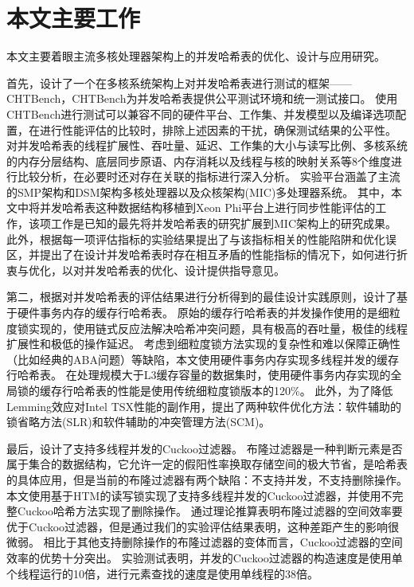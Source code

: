 \section{本文主要工作}
本文主要着眼主流多核处理器架构上的并发哈希表的优化、设计与应用研究。

首先，设计了一个在多核系统架构上对并发哈希表进行测试的框架——CHTBench，CHTBench为并发哈希表提供公平测试环境和统一测试接口。
使用CHTBench进行测试可以兼容不同的硬件平台、工作集、并发模型以及编译选项配置，在进行性能评估的比较时，排除上述因素的干扰，确保测试结果的公平性。
对并发哈希表的线程扩展性、吞吐量、延迟、工作集的大小与读写比例、多核系统的内存分层结构、底层同步原语、内存消耗以及线程与核的映射关系等8个维度进行比较分析，在必要时还对存在关联的指标进行深入分析。
实验平台涵盖了主流的SMP架构和DSM架构多核处理器以及众核架构(MIC)多处理器系统。
其中，本文中将并发哈希表这种数据结构移植到Xeon Phi平台上进行同步性能评估的工作，该项工作是已知的最先将并发哈希表的研究扩展到MIC架构上的研究成果。
此外，根据每一项评估指标的实验结果提出了与该指标相关的性能陷阱和优化误区，并提出了在设计并发哈希表时存在相互矛盾的性能指标的情况下，如何进行折衷与优化，以对并发哈希表的优化、设计提供指导意见。

第二，根据对并发哈希表的评估结果进行分析得到的最佳设计实践原则，设计了基于硬件事务内存的缓存行哈希表。
原始的缓存行哈希表的并发操作使用的是细粒度锁实现的，使用链式反应法解决哈希冲突问题，具有极高的吞吐量，极佳的线程扩展性和极低的操作延迟。
考虑到细粒度锁方法实现的复杂性和难以保障正确性（比如经典的ABA问题）等缺陷，本文使用硬件事务内存实现多线程并发的缓存行哈希表。
在处理规模大于L3缓存容量的数据集时，使用硬件事务内存实现的全局锁的缓存行哈希表的性能是使用传统细粒度锁版本的120\%。
此外，为了降低Lemming效应对Intel TSX性能的副作用，提出了两种软件优化方法：软件辅助的锁省略方法(SLR)和软件辅助的冲突管理方法(SCM)。


最后，设计了支持多线程并发的Cuckoo过滤器。
布隆过滤器是一种判断元素是否属于集合的数据结构，它允许一定的假阳性率换取存储空间的极大节省，是哈希表的具体应用，但是当前的布隆过滤器有两个缺陷：不支持并发，不支持删除操作。
本文使用基于HTM的读写锁实现了支持多线程并发的Cuckoo过滤器，并使用不完整Cuckoo哈希方法实现了删除操作。
通过理论推算表明布隆过滤器的空间效率要优于Cuckoo过滤器，但是通过我们的实验评估结果表明，这种差距产生的影响很微弱。
相比于其他支持删除操作的布隆过滤器的变体而言，Cuckoo过滤器的空间效率的优势十分突出。
实验测试表明，并发的Cuckoo过滤器的构造速度是使用单个线程运行的10倍，进行元素查找的速度是使用单线程的38倍。


